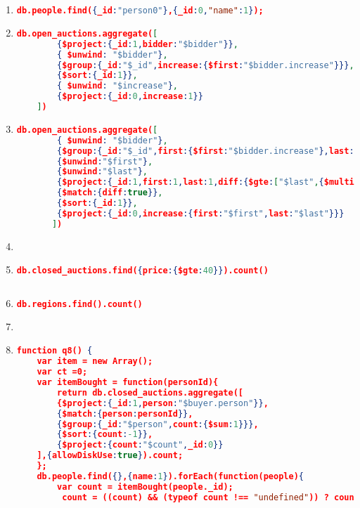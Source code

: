 \begin{enumerate}[label=Q\arabic*]
	\item \label{mongodb-q-1}%
	\begin{lstlisting}[language=JSON,  basicstyle=\scriptsize]
		db.people.find({_id:"person0"},{_id:0,"name":1});
	\end{lstlisting}
	
	\item \label{mongodb-q-2}%
	\begin{lstlisting}[language=JSON,  basicstyle=\scriptsize]
	db.open_auctions.aggregate([
		{$project:{_id:1,bidder:"$bidder"}},
		{ $unwind: "$bidder"},
		{$group:{_id:"$_id",increase:{$first:"$bidder.increase"}}},
		{$sort:{_id:1}},
		{ $unwind: "$increase"},
		{$project:{_id:0,increase:1}}
	])
	\end{lstlisting}
	
    \item \label{mongodb-q-3}%
	\begin{lstlisting}[language=JSON,   basicstyle=\scriptsize]
	   db.open_auctions.aggregate([
		{ $unwind: "$bidder"},
		{$group:{_id:"$_id",first:{$first:"$bidder.increase"},last:{$last:"$bidder.increase"}}},
		{$unwind:"$first"},
		{$unwind:"$last"},
		{$project:{_id:1,first:1,last:1,diff:{$gte:["$last",{$multiply:["$first",2]}]}}},
		{$match:{diff:true}},
		{$sort:{_id:1}},
		{$project:{_id:0,increase:{first:"$first",last:"$last"}}}
	   ])
	\end{lstlisting}
	
    \item %
	\par
	
	
    \item \label{mongodb-q-5}%
	\begin{lstlisting}[language=JSON,   basicstyle=\scriptsize]
	   db.closed_auctions.find({price:{$gte:40}}).count()
	   
	\end{lstlisting}
	
    \item \label{mongodb-q-6}%
	\begin{lstlisting}[language=JSON,   basicstyle=\scriptsize]
	   db.regions.find().count()
	\end{lstlisting}
	
	
    \item %
	\par
	
	
    \item \label{mongodb-q-8}%
	\begin{lstlisting}[language=JSON,   basicstyle=\scriptsize]
	   function q8() {
    var item = new Array();
	var ct =0;
	var itemBought = function(personId){
		return db.closed_auctions.aggregate([
		{$project:{_id:1,person:"$buyer.person"}},
		{$match:{person:personId}},
		{$group:{_id:"$person",count:{$sum:1}}},
		{$sort:{count:-1}},
		{$project:{count:"$count",_id:0}}
	],{allowDiskUse:true}).count;
	};
    db.people.find({},{name:1}).forEach(function(people){
		var count = itemBought(people._id);
		 count = ((count) && (typeof count !== "undefined")) ? count : 0 ;
		

\end{lstlisting}
\end{enumerate}
